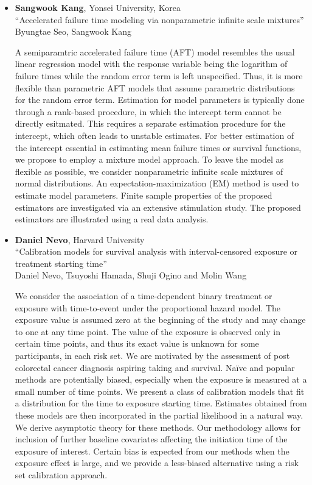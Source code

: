 \begin{itemize}
\item \textbf{Sangwook Kang}, Yonsei University, Korea \\
``Accelerated failure time modeling via nonparametric infinite scale mixtures'' \\
Byungtae Seo, Sangwook Kang


A semiparamtric accelerated failure time (AFT) model resembles the usual linear regression model with the response variable being the logarithm of failure times while the random error term is left unspecified. Thus, it is more flexible than parametric AFT models that
assume parametric distributions for the random error term. Estimation for model parameters is typically done through a rank-based procedure, in which the intercept term cannot be directly esitmated. This requires a separate estimation procedure for the intercept, which often leads to unstable estimates. For better estimation of the intercept essential in estimating mean failure times or survival functions, we propose to employ a mixture model approach. To leave the model as 
flexible as possible, we consider nonparametric infinite scale mixtures of normal distributions. An expectation-maximization (EM) method is used to estimate model parameters. Finite sample properties of the proposed estimators are investigated via
an extensive stimulation study. The proposed estimators are illustrated using a real data analysis.

\item \textbf{Daniel Nevo}, Harvard University \\
``Calibration models for survival analysis with interval-censored exposure or treatment starting time'' \\
Daniel Nevo, Tsuyoshi Hamada, Shuji Ogino and Molin Wang


We consider the association of a time-dependent binary treatment or exposure with time-to-event under the proportional hazard model. The exposure value is assumed zero at the beginning of the study and may change to one at any time point. The value of the exposure is observed only in certain time points, and thus its exact value is unknown for some participants, in each risk set. We are motivated by the assessment of post colorectal cancer diagnosis aspiring taking and survival. Naïve and popular methods are potentially biased, especially when the exposure is measured at a small number of time points. We present a class of calibration models that fit a distribution for the time to exposure starting time. Estimates obtained from these models are then incorporated in the partial likelihood in a natural way. We derive asymptotic theory for these methods. Our methodology allows for inclusion of further baseline covariates affecting the initiation time of the exposure of interest.  Certain bias is expected from our methods when the exposure effect is large, and we provide a less-biased alternative using a risk set calibration approach. 


\end{itemize}
